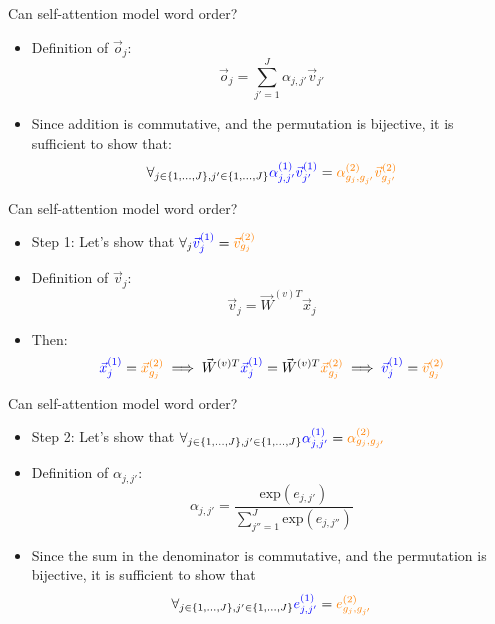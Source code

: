 \documentclass[11pt,compress,t,notes=noshow, xcolor=table]{beamer}
\begin{document}

\begin{vbframe}{Can self-attention model word order?}

\vfill

\begin{itemize}
\item Definition of $\vec o_j$:
$$\vec o_j = \sum_{j'=1}^J \alpha_{j,j'} \vec v_{j'}$$
\item Since addition is commutative, and the permutation is bijective, it is sufficient to show that:
$$\forall_{j \in \{1,...,J\}, j' \in \{1,...,J\}} \textcolor{blue}{\alpha^{(1)}_{j,j'} \vec v^{(1)}_{j'}} = \textcolor{orange}{\alpha^{(2)}_{g_j,g_{j'}} \vec v^{(2)}_{g_{j'}}}$$
\end{itemize}

\vfill

\end{vbframe}


\begin{vbframe}{Can self-attention model word order?}

\vfill

\begin{itemize}
\item Step 1: Let's show that $\forall_{j} \textcolor{blue}{\vec v^{(1)}_{j}} = \textcolor{orange}{\vec v^{(2)}_{g_{j}}}$
\item Definition of $\vec v_j$:
$$\vec v_j = \vec W^{(v)T} \vec x_j$$
\item Then:
$$\textcolor{blue}{\vec x^{(1)}_{j}} = \textcolor{orange}{\vec x^{(2)}_{g_{j}}} \implies \vec W^{(v)T} \textcolor{blue}{\vec x^{(1)}_{j}} = \vec W^{(v)T} \textcolor{orange}{\vec x^{(2)}_{g_{j}}} \implies \textcolor{blue}{\vec v^{(1)}_j} = \textcolor{orange}{\vec v^{(2)}_{g_j}}$$
\end{itemize}

\vfill

\end{vbframe}


\begin{vbframe}{Can self-attention model word order?}

\vfill

\begin{itemize}
\item Step 2: Let's show that $\forall_{j \in \{1,...,J\}, j' \in \{1,...,J\}} \textcolor{blue}{\alpha^{(1)}_{j, j'}} = \textcolor{orange}{\alpha^{(2)}_{g_j, g_{j'}}}$
\item Definition of $\alpha_{j,j'}$:
$$\alpha_{j,j'} = \frac{\mathrm{exp}(e_{j,j'})}{\sum_{j''=1}^J \mathrm{exp}(e_{j,j''})}$$
\item Since the sum in the denominator is commutative, and the permutation is bijective, it is sufficient to show that
$$\forall_{j \in \{1,...,J\}, j' \in \{1,...,J\}} \textcolor{blue}{e^{(1)}_{j,j'}} = \textcolor{orange}{e^{(2)}_{g_j, g_{j'}}}$$
\end{itemize}

\vfill

\end{vbframe}
\end{document}
